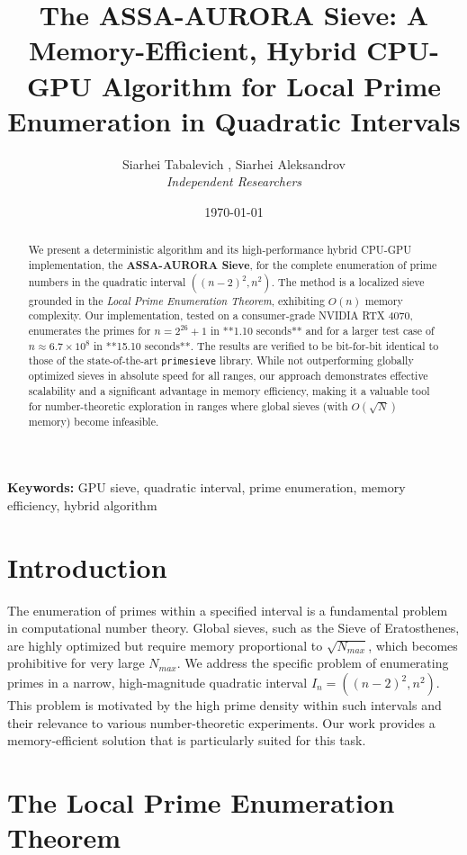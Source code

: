 \documentclass[11pt]{article}
\title{\textbf{The ASSA-AURORA Sieve: A Memory-Efficient, Hybrid CPU-GPU Algorithm for Local Prime Enumeration in Quadratic Intervals}}
\author{Siarhei Tabalevich \orcidlink{0009-0007-4425-9443}, Siarhei Aleksandrov \\ \textit{Independent Researchers}}
\date{\today}
\begin{document}
\maketitle

\begin{abstract}
We present a deterministic algorithm and its high-performance hybrid CPU-GPU implementation, the \textbf{ASSA-AURORA Sieve}, for the complete enumeration of prime numbers in the quadratic interval $((n-2)^2, n^2)$. The method is a localized sieve grounded in the \textit{Local Prime Enumeration Theorem}, exhibiting $O(n)$ memory complexity. Our implementation, tested on a consumer-grade NVIDIA RTX 4070, enumerates the primes for $n = 2^{26}+1$ in **1.10 seconds** and for a larger test case of $n \approx 6.7 \times 10^8$ in **15.10 seconds**. The results are verified to be bit-for-bit identical to those of the state-of-the-art \texttt{primesieve} library. While not outperforming globally optimized sieves in absolute speed for all ranges, our approach demonstrates effective scalability and a significant advantage in memory efficiency, making it a valuable tool for number-theoretic exploration in ranges where global sieves (with $O(\sqrt{N})$ memory) become infeasible.
\end{abstract}

\noindent\textbf{Keywords:} GPU sieve, quadratic interval, prime enumeration, memory efficiency, hybrid algorithm

\section{Introduction}

The enumeration of primes within a specified interval is a fundamental problem in computational number theory. Global sieves, such as the Sieve of Eratosthenes, are highly optimized but require memory proportional to $\sqrt{N_{max}}$, which becomes prohibitive for very large $N_{max}$. We address the specific problem of enumerating primes in a narrow, high-magnitude quadratic interval $I_n = ((n-2)^2, n^2)$. This problem is motivated by the high prime density within such intervals and their relevance to various number-theoretic experiments. Our work provides a memory-efficient solution that is particularly suited for this task.

\section{The Local Prime Enumeration Theorem}
\end{document}
